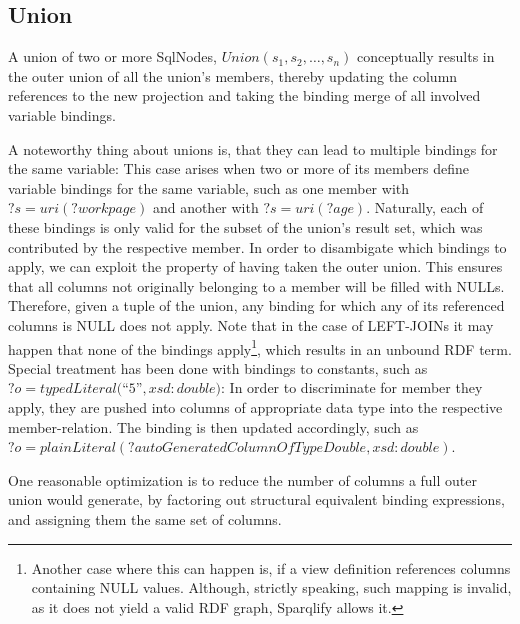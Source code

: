 \documentclass[a4paper,twoside,bibtotoc,abstracton,12pt,BCOR=15mm]{scrreprt}
\newcommand{\todo}[1]{\textbf{ToDo: \textit{#1}}}
\begin{document}
\subsection{Union}
A union of two or more SqlNodes, $Union(s_1, s_2, \ldots, s_n)$ conceptually results in the outer union of all
the union's members, thereby updating the column references to the new projection and taking the binding merge of all involved variable bindings.

A noteworthy thing about unions is, that they can lead to multiple bindings for the same variable:
This case arises when two or more of its members define variable bindings for the same variable, such as one member with $?s = uri(?workpage)$ and another with $?s = uri(?age)$.
Naturally, each of these bindings is only valid for the subset of the union's result set, which was contributed by the respective member.
In order to disambigate which bindings to apply, we can exploit the property of having taken the outer union. This ensures that all columns not originally belonging to a member will be filled with NULLs.
Therefore, given a tuple of the union, any binding for which any of its referenced columns is NULL does not apply. Note that in the case of LEFT-JOINs it may happen that none of the bindings
apply\footnote{Another case where this can happen is, if a view definition references columns containing NULL values. Although, strictly speaking, such mapping is invalid, as it does not yield a valid RDF graph, Sparqlify allows it.}, which
results in an unbound RDF term.
Special treatment has been done with bindings to constants, such as $?o = typedLiteral($``$5$''$, xsd:double)$: In order to discriminate for member they apply,
they are pushed into columns of appropriate data type into the respective member-relation. The binding is then updated accordingly, such as $?o = plainLiteral(?autoGeneratedColumnOfTypeDouble, xsd:double)$.


One reasonable optimization is to reduce the number of columns a full outer union would generate, by factoring out structural equivalent binding expressions, and assigning them the same set of columns.


\end{document}
